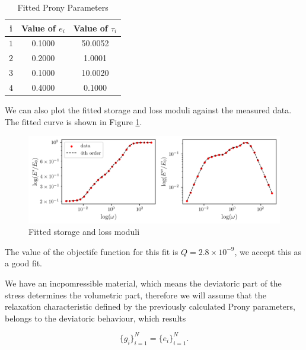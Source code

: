 \documentclass[12pt,a4paper]{article}
\begin{document}
\begin{table}[H]
    \centering
    \caption{Fitted Prony Parameters}
    \label{tab:prony_parameters}
    \begin{tabular}{|c|c|c|}
        \hline
        \textbf{i} & \textbf{Value of $e_i$} & \textbf{Value of $\tau_i$} \\ \hline
        $1$              & 0.1000             & 50.0052                    \\ \hline
        $2$              & 0.2000              &  1.0001                   \\ \hline
        $3$              & 0.1000              & 10.0020                    \\ \hline
        $4$              & 0.4000              & 0.1000                    \\ \hline
    \end{tabular}
\end{table}

We can also plot the fitted storage and loss moduli against the measured data. The fitted curve is shown in Figure \ref{fig:fittedmodel}.
\begin{figure}[H]
    \centering
    \includegraphics[scale=0.875]{figures/fitted.png}
    \caption{Fitted storage and loss moduli}
    \label{fig:fittedmodel}
\end{figure}

The value of the objectife function for this fit is $Q = 2.8\times 10^{-9}$, we accept this as a good fit.

\newpage

We have an incpomressible material, which means the deviatoric part of the stress determines the volumetric part, therefore we will assume that the relaxation characteristic defined by the previously calculated Prony parameters, belongs to the deviatoric behaviour, which results

\begin{equation}
    \{g_i\}_{i=1}^N = \{e_i\}_{i=1}^N.
\end{equation}
\end{document}
